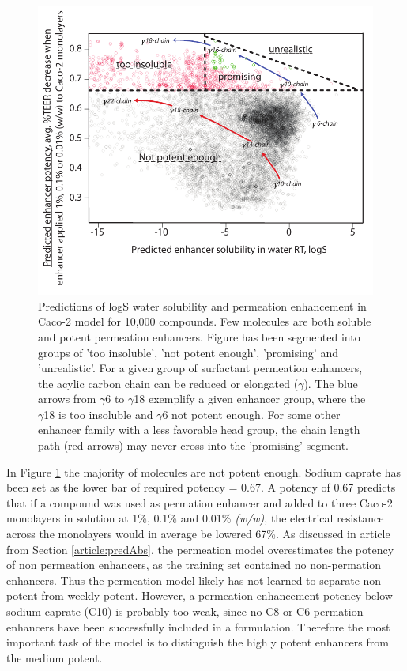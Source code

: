 \begin{figure}[!htbp]
\includegraphics[width=\textwidth,height=\textheight,keepaspectratio]{graphics/screened_molecules3.pdf}
\caption{Predictions of logS water solubility and permeation enhancement in Caco-2 model for 10,000 compounds. Few molecules are both soluble and potent permeation enhancers. Figure has been segmented into groups of 'too insoluble', 'not potent enough', 'promising' and 'unrealistic'. For a given group of surfactant permeation enhancers, the acylic carbon chain can be reduced or elongated ($\gamma$). The blue arrows from $\gamma$6 to $\gamma$18 exemplify a given enhancer group, where the $\gamma$18 is too insoluble and $\gamma$6 not potent enough. For some other enhancer family with a less favorable head group, the chain length path (red arrows) may never cross into the 'promising' segment.}
\label{predictionsCombined}
\end{figure}

In Figure \ref{predictionsCombined} the majority of molecules are not potent enough. Sodium caprate has been set as the lower bar of required potency = 0.67. A potency of 0.67 predicts that if a compound was used as permation enhancer and added to three Caco-2 monolayers in solution at 1\%, 0.1\% and 0.01\% \textit{(w/w)}, the electrical resistance across the monolayers would in average be lowered 67\%. As discussed in article from Section \ref{article:predAbs}, the permeation model overestimates the potency of non permeation enhancers, as the training set contained no non-permation enhancers. Thus the permeation model likely has not learned to separate non potent from weekly potent. However, a permeation enhancement potency below sodium caprate (C10) is probably too weak, since no C8 or C6 permation enhancers have been successfully included in a formulation. Therefore the most important task of the model is to distinguish the highly potent enhancers from the medium potent.

